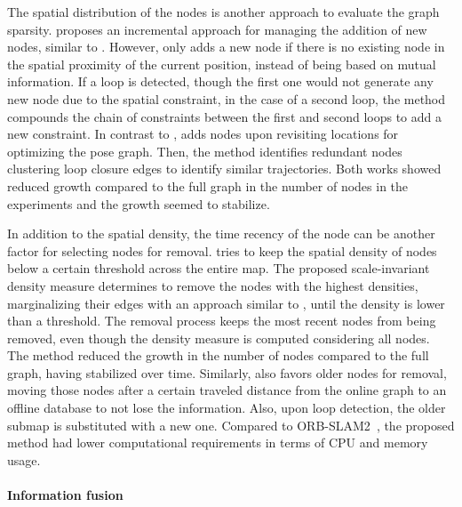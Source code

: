 The spatial distribution of the nodes is another approach to evaluate the graph sparsity.
\cite{johannsson-et-al:2013:6630556} proposes an incremental approach for managing the addition of new nodes, similar to \cite{ila-et-al:2017:0278364917691110}. However, \cite{johannsson-et-al:2013:6630556} only adds a new node if there is no existing node in the spatial proximity of the current position, instead of being based on mutual information. If a loop is detected, though the first one would not generate any new node due to the spatial constraint, in the case of a second loop, the method compounds the chain of constraints between the first and second loops to add a new constraint.
In contrast to \cite{johannsson-et-al:2013:6630556}, \cite{zeng-si:2021:6} adds nodes upon revisiting locations for optimizing the pose graph. Then, the method identifies redundant nodes clustering loop closure edges to identify similar trajectories.
Both works showed reduced growth compared to the full graph in the number of nodes in the experiments and the growth seemed to stabilize.

In addition to the spatial density, the time recency of the node can be another factor for selecting nodes for removal.
\cite{kurz-et-al:2021:9636530} tries to keep the spatial density of nodes below a certain threshold across the entire map. The proposed scale-invariant density measure determines to remove the nodes with the highest densities, marginalizing their edges with an approach similar to \cite{kretzschmar-et-al:2010:2}, until the density is lower than a threshold. The removal process keeps the most recent nodes from being removed, even though the density measure is computed considering all nodes. The method reduced the growth in the number of nodes compared to the full graph, having stabilized over time.
Similarly, \cite{ali-et-al:2021:3100882} also favors older nodes for removal, moving those nodes after a certain traveled distance from the online graph to an offline database to not lose the information. Also, upon loop detection, the older submap is substituted with a new one. Compared to ORB-SLAM2~\parencite{discussion:orb-slam2}, the proposed method had lower computational requirements in terms of CPU and memory usage.


\paragraph{Information fusion}

